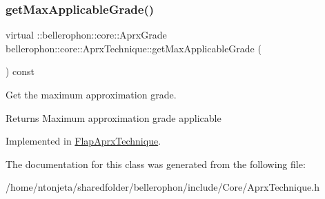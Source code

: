\subsubsection{\texorpdfstring{get\+Max\+Applicable\+Grade()}{getMaxApplicableGrade()}}
{\footnotesize\ttfamily virtual \+::bellerophon\+::core\+::\+Aprx\+Grade bellerophon\+::core\+::\+Aprx\+Technique\+::get\+Max\+Applicable\+Grade (\begin{DoxyParamCaption}{ }\end{DoxyParamCaption}) const\hspace{0.3cm}{\ttfamily [pure virtual]}}



Get the maximum approximation grade. 

\begin{DoxyReturn}{Returns}
Maximum approximation grade applicable 
\end{DoxyReturn}


Implemented in \hyperlink{classFlapAprxTechnique_af35c36c904e8c077c3fdf6bd35f5192c}{Flap\+Aprx\+Technique}.



The documentation for this class was generated from the following file\+:\begin{DoxyCompactItemize}
\item 
/home/ntonjeta/sharedfolder/bellerophon/include/\+Core/Aprx\+Technique.\+h\end{DoxyCompactItemize}
